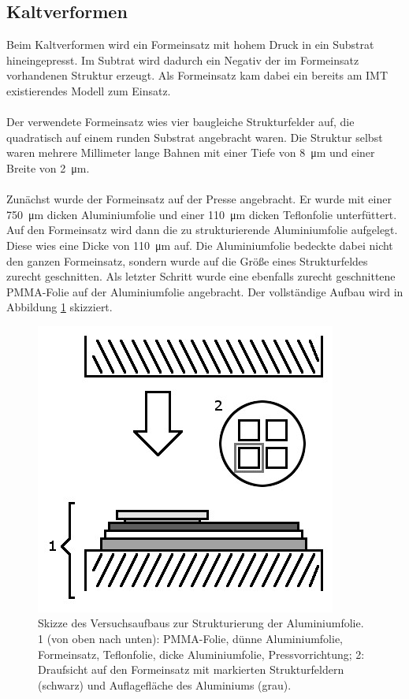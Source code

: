 \documentclass[a4paper, 11pt, headsepline,footsepline,twoside,abstract]{scrbook}
\begin{document}
\subsection{Kaltverformen}
Beim Kaltverformen wird ein Formeinsatz mit hohem Druck in ein Substrat hineingepresst. Im Subtrat wird dadurch ein Negativ der im Formeinsatz vorhandenen Struktur erzeugt. Als Formeinsatz kam dabei ein bereits am IMT existierendes Modell zum Einsatz. \\\\
Der verwendete Formeinsatz wies vier baugleiche Strukturfelder auf, die quadratisch auf einem runden Substrat angebracht waren. Die Struktur selbst waren mehrere Millimeter lange Bahnen mit einer Tiefe von \SI{8}{\micro\meter} und einer Breite von \SI{2}{\micro\meter}. \\\\
Zunächst wurde der Formeinsatz auf der Presse angebracht. Er wurde mit einer \SI{750}{\micro\meter} dicken Aluminiumfolie und einer \SI{110}{\micro\meter} dicken Teflonfolie unterfüttert. Auf den Formeinsatz wird dann die zu strukturierende Aluminiumfolie aufgelegt. Diese wies eine Dicke von \SI{110}{\micro\meter} auf. Die Aluminiumfolie bedeckte dabei nicht den ganzen Formeinsatz, sondern wurde auf die Größe eines Strukturfeldes zurecht geschnitten. Als letzter Schritt wurde eine ebenfalls zurecht geschnittene PMMA-Folie auf der Aluminiumfolie angebracht. Der vollständige Aufbau wird in Abbildung \ref{schema_strukturierung} skizziert.
\begin{figure}[h]
	\centering
	\includegraphics[width=0.7\columnwidth]{images/Schema_Strukturierung.jpg}
	\caption{Skizze des Versuchsaufbaus zur Strukturierung der Aluminiumfolie. 1 (von oben nach unten): PMMA-Folie, dünne Aluminiumfolie, Formeinsatz, Teflonfolie, dicke Aluminiumfolie, Pressvorrichtung; 2: Draufsicht auf den Formeinsatz mit markierten Strukturfeldern (schwarz) und Auflagefläche des Aluminiums (grau).}
	\label{schema_strukturierung}
\end{figure}
\end{document}
